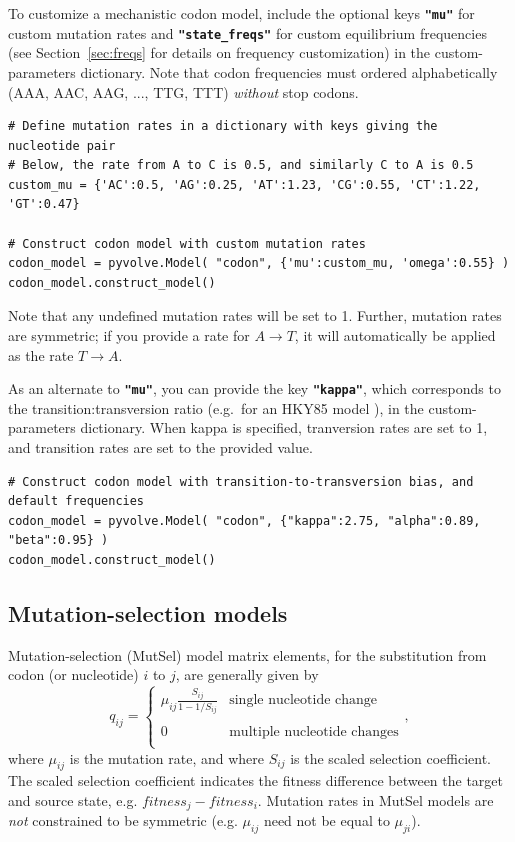 \documentclass{article}
\newcommand{\code}[1]{\textbf{\texttt{\small{#1}}}}
\begin{document}
To customize a mechanistic codon model, include the optional keys \code{"mu"} for custom mutation rates and \code{"state\_freqs"} for custom equilibrium frequencies (see Section~\ref{sec:freqs} for details on frequency customization) in the custom-parameters dictionary. Note that codon frequencies must ordered alphabetically (AAA, AAC, AAG, ..., TTG, TTT) \emph{without} stop codons.

\begin{lstlisting}
# Define mutation rates in a dictionary with keys giving the nucleotide pair
# Below, the rate from A to C is 0.5, and similarly C to A is 0.5
custom_mu = {'AC':0.5, 'AG':0.25, 'AT':1.23, 'CG':0.55, 'CT':1.22, 'GT':0.47} 

# Construct codon model with custom mutation rates
codon_model = pyvolve.Model( "codon", {'mu':custom_mu, 'omega':0.55} )
codon_model.construct_model()
\end{lstlisting}
Note that any undefined mutation rates will be set to 1. Further, mutation rates are symmetric; if you provide a rate for $A \rightarrow T$, it will automatically be applied as the rate $T \rightarrow A$. 

As an alternate to \code{"mu"}, you can provide the key \code{"kappa"}, which corresponds to the transition:transversion ratio (e.g.\ for an HKY85  model \citep{HKY85}), in the custom-parameters dictionary. When kappa is specified, tranversion rates are set to 1, and transition rates are set to the provided value.
\begin{lstlisting}
# Construct codon model with transition-to-transversion bias, and default frequencies
codon_model = pyvolve.Model( "codon", {"kappa":2.75, "alpha":0.89, "beta":0.95} )
codon_model.construct_model()
\end{lstlisting}




\subsection{Mutation-selection models}\label{sec:mutsel_basic}
Mutation-selection (MutSel) model \citep{HB98} matrix elements, for the substitution from codon (or nucleotide) $i$ to $j$, are generally given by 
\begin{equation}
q_{ij} = \left\{ 
\begin{array}{rl}
	\mu_{ij} \frac{S_{ij}}{1-1/S_{ij}} &\text{single nucleotide change} \\\\
	0                                  &\text{multiple nucleotide changes} \\             
\end{array} \right.,
\end{equation} where $\mu_{ij}$ is the mutation rate, and where $S_{ij}$ is the scaled selection coefficient. The scaled selection coefficient indicates the fitness difference between the target and source state, e.g. $fitness_j - fitness_i$. Mutation rates in MutSel models are \emph{not} constrained to be symmetric (e.g. $\mu_{ij}$ need not be equal to $\mu_{ji}$). 
\end{document}
